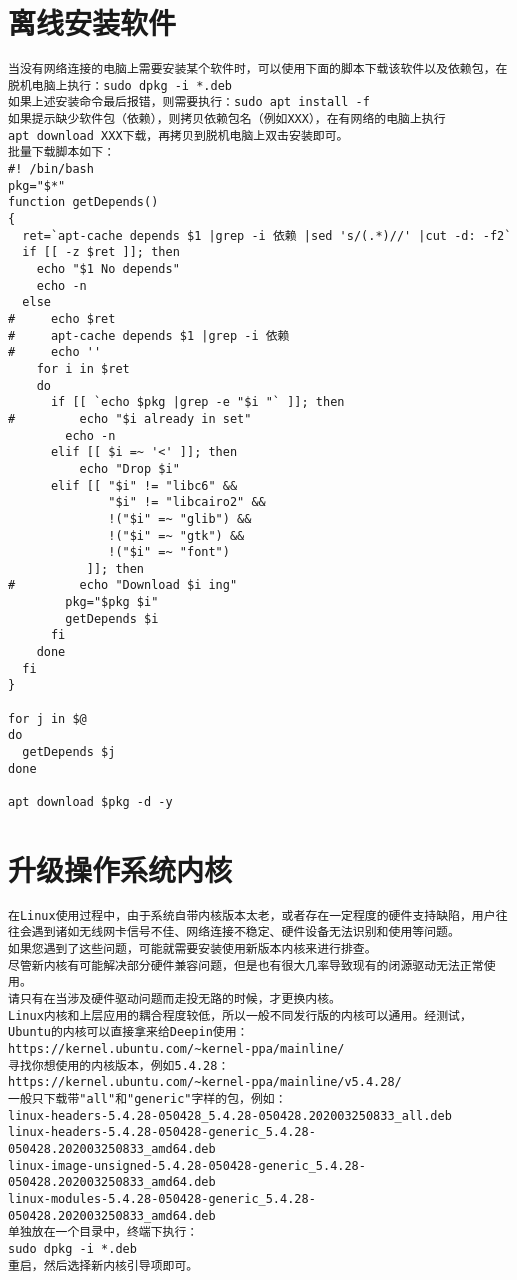 \documentclass[a4paper,fontset=fandol,zihao=-4,linespread=1.2]{ctexbook}
\begin{document}
\section{离线安装软件}
\begin{lstlisting}
当没有网络连接的电脑上需要安装某个软件时，可以使用下面的脚本下载该软件以及依赖包，在脱机电脑上执行：sudo dpkg -i *.deb
如果上述安装命令最后报错，则需要执行：sudo apt install -f
如果提示缺少软件包（依赖），则拷贝依赖包名（例如XXX），在有网络的电脑上执行
apt download XXX下载，再拷贝到脱机电脑上双击安装即可。
批量下载脚本如下：
#! /bin/bash
pkg="$*"
function getDepends()
{
  ret=`apt-cache depends $1 |grep -i 依赖 |sed 's/(.*)//' |cut -d: -f2`
  if [[ -z $ret ]]; then
    echo "$1 No depends"
    echo -n
  else
#     echo $ret
#     apt-cache depends $1 |grep -i 依赖
#     echo ''
    for i in $ret
    do
      if [[ `echo $pkg |grep -e "$i "` ]]; then
#         echo "$i already in set"
        echo -n
      elif [[ $i =~ '<' ]]; then
          echo "Drop $i"
      elif [[ "$i" != "libc6" &&
              "$i" != "libcairo2" &&
              !("$i" =~ "glib") &&
              !("$i" =~ "gtk") &&
              !("$i" =~ "font")
           ]]; then
#         echo "Download $i ing"
        pkg="$pkg $i"
        getDepends $i
      fi
    done
  fi
}

for j in $@
do
  getDepends $j
done

apt download $pkg -d -y
\end{lstlisting}

\section{升级操作系统内核}
\begin{lstlisting}
在Linux使用过程中，由于系统自带内核版本太老，或者存在一定程度的硬件支持缺陷，用户往往会遇到诸如无线网卡信号不佳、网络连接不稳定、硬件设备无法识别和使用等问题。
如果您遇到了这些问题，可能就需要安装使用新版本内核来进行排查。
尽管新内核有可能解决部分硬件兼容问题，但是也有很大几率导致现有的闭源驱动无法正常使用。
请只有在当涉及硬件驱动问题而走投无路的时候，才更换内核。
Linux内核和上层应用的耦合程度较低，所以一般不同发行版的内核可以通用。经测试，Ubuntu的内核可以直接拿来给Deepin使用：
https://kernel.ubuntu.com/~kernel-ppa/mainline/
寻找你想使用的内核版本，例如5.4.28：
https://kernel.ubuntu.com/~kernel-ppa/mainline/v5.4.28/
一般只下载带"all"和"generic"字样的包，例如：
linux-headers-5.4.28-050428_5.4.28-050428.202003250833_all.deb
linux-headers-5.4.28-050428-generic_5.4.28-050428.202003250833_amd64.deb
linux-image-unsigned-5.4.28-050428-generic_5.4.28-050428.202003250833_amd64.deb
linux-modules-5.4.28-050428-generic_5.4.28-050428.202003250833_amd64.deb
单独放在一个目录中，终端下执行：
sudo dpkg -i *.deb
重启，然后选择新内核引导项即可。
\end{lstlisting}
\end{document}
